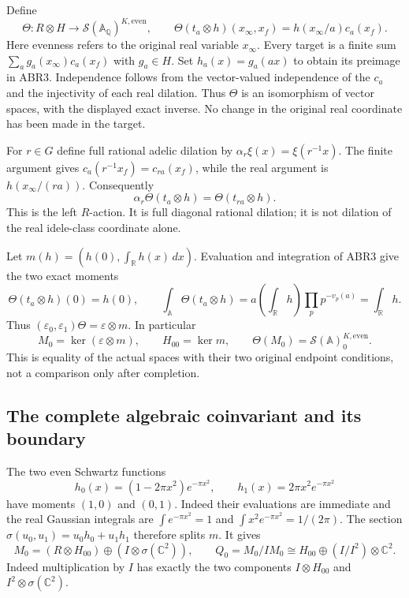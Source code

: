 \documentclass[11pt]{article}
\begin{document}
Define
\begin{equation}\tag{ABR3}
 \Theta:R\otimes H\longrightarrow
           \mathcal S(\mathbb A_{\mathbb Q})^{K,\mathrm{even}},
 \qquad
 \Theta(t_a\otimes h)(x_\infty,x_f)
       =h(x_\infty/a)c_a(x_f).
\end{equation}
Here evenness refers to the original real variable $x_\infty$.
Every target is a finite sum $\sum_a g_a(x_\infty)c_a(x_f)$ with
$g_a\in H$. Set $h_a(x)=g_a(ax)$ to obtain its preimage in ABR3.
Independence follows from the vector-valued independence of the
$c_a$ and the injectivity of each real dilation. Thus $\Theta$ is
an isomorphism of vector spaces, with the displayed exact inverse.
No change in the original real coordinate has been made in the target.

For $r\in G$ define full rational adelic dilation by
$\alpha_r\xi(x)=\xi(r^{-1}x)$. The finite argument gives
$c_a(r^{-1}x_f)=c_{ra}(x_f)$, while the real argument is
$h(x_\infty/(ra))$. Consequently
\begin{equation}\tag{ABR4}
 \alpha_r\Theta(t_a\otimes h)=\Theta(t_{ra}\otimes h).
\end{equation}
This is the left $R$-action. It is full diagonal rational dilation;
it is not dilation of the real idele-class coordinate alone.

Let $m(h)=(h(0),\int_{\mathbb R}h(x)\,dx)$. Evaluation and
integration of ABR3 give the two exact moments
\begin{equation}\tag{ABR5}
 \Theta(t_a\otimes h)(0)=h(0),\qquad
 \int_{\mathbb A}\Theta(t_a\otimes h)
     =a\left(\int_{\mathbb R}h\right)
                     \prod_p p^{-v_p(a)}=\int_{\mathbb R}h.
\end{equation}
Thus $(\varepsilon_0,\varepsilon_1)\Theta=\varepsilon\otimes m$.
In particular
\begin{equation}\tag{ABR6}
 M_0=\ker(\varepsilon\otimes m),\qquad H_{00}=\ker m,
 \qquad
 \Theta(M_0)=\mathcal S(\mathbb A)_0^{K,\mathrm{even}}.
\end{equation}
This is equality of the actual spaces with their two original
endpoint conditions, not a comparison only after completion.

\subsection{The complete algebraic coinvariant and its boundary}

The two even Schwartz functions
\[
 h_0(x)=(1-2\pi x^2)e^{-\pi x^2},\qquad
 h_1(x)=2\pi x^2e^{-\pi x^2}
\]
have moments $(1,0)$ and $(0,1)$. Indeed their evaluations are
immediate and the real Gaussian integrals are
$\int e^{-\pi x^2}=1$ and $\int x^2e^{-\pi x^2}=1/(2\pi)$.
The section $\sigma(u_0,u_1)=u_0h_0+u_1h_1$ therefore splits $m$.
It gives
\begin{equation}\tag{ABR7}
 M_0=(R\otimes H_{00})\oplus(I\otimes\sigma(\mathbb C^2)),
 \qquad
 Q_0=M_0/IM_0\cong H_{00}\oplus(I/I^2)\otimes\mathbb C^2.
\end{equation}
Indeed multiplication by $I$ has exactly the two components
$I\otimes H_{00}$ and $I^2\otimes\sigma(\mathbb C^2)$.
\end{document}
